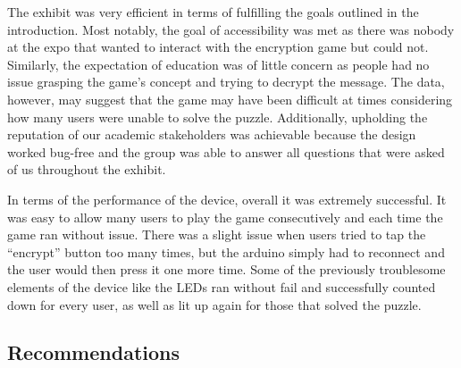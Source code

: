 \documentclass[conference]{IEEEtran}
\begin{document}
\par The exhibit was very efficient in terms of fulfilling the goals outlined in the introduction. Most notably, the goal of accessibility was met as there was nobody at the expo that wanted to interact with the encryption game but could not. Similarly, the expectation of education was of little concern as people had no issue grasping the game’s concept and trying to decrypt the message. The data, however, may suggest that the game may have been difficult at times considering how many users were unable to solve the puzzle. Additionally, upholding the reputation of our academic stakeholders was achievable because the design worked bug-free and the group was able to answer all questions that were asked of us throughout the exhibit. 
\par In terms of the performance of the device, overall it was extremely successful. It was easy to allow many users to play the game consecutively and each time the game ran without issue. There was a slight issue when users tried to tap the “encrypt” button too many times, but the arduino simply had to reconnect and the user would then press it one more time. Some of the previously troublesome elements of the device like the LEDs ran without fail and successfully counted down for every user, as well as lit up again for those that solved the puzzle. 


\subsection{Recommendations}
\end{document}
